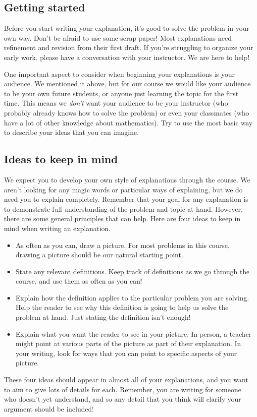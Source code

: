 \documentclass[noauthor,nooutcomes]{ximera}
\begin{document}
\subsection{Getting started}
Before you start writing your explanation, it's good to solve the problem in your own way. Don't be afraid to use some scrap paper! Most explanations need refinement and revision from their first draft. If you're struggling to organize your early work, please have a conversation with your instructor. We are here to help!

One important aspect to consider when beginning your explanations is your audience. We mentioned it above, but for our course we would like your audience to be your own future students, or anyone just learning the topic for the first time. This means we {\em don't} want your audience to be your instructor (who probably already knows how to solve the problem) or even your classmates (who have a lot of other knowledge about mathematics). Try to use the most basic way to describe your ideas that you can imagine.

\subsection{Ideas to keep in mind}
We expect you to develop your own style of explanations through the course. We aren't looking for any magic words or particular ways of explaining, but we do need you to explain completely. Remember that your goal for any explanation is to demonstrate full understanding of the problem and topic at hand. However, there are some general principles that can help. Here are four ideas to keep in mind when writing an explanation.
\begin{itemize}
	\item As often as you can, draw a picture. For most problems in this course, drawing a picture should be our natural starting point.
	\item State any relevant definitions. Keep track of definitions as we go through the course, and use them as often as you can!
	\item Explain how the definition applies to the particular problem you are solving. Help the reader to see why this definition is going to help us solve the problem at hand. Just stating the definition isn't enough!
	\item Explain what you want the reader to see in your picture. In person, a teacher might point at various parts of the picture as part of their explanation. In your writing, look for ways that you can point to specific aspects of your picture.
\end{itemize}
These four ideas should appear in almost all of your explanations, and you want to aim to give lots of details for each. Remember, you are writing for someone who doesn't yet understand, and so any detail that you think will clarify your argument should be included!
\end{document}
